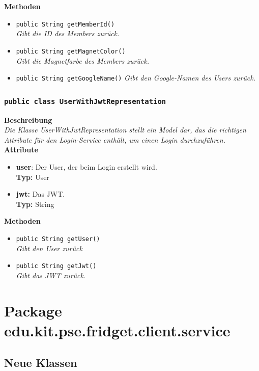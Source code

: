 \documentclass[a4paper]{scrreprt}
\begin{document}
	\textbf{Methoden}
	\begin{itemize}
		\item{\texttt{public String getMemberId()}}\\
		\textit{Gibt die ID des Members zurück.}\\
		\item{\texttt{public String getMagnetColor()}}\\
		\textit{Gibt die Magnetfarbe des Members zurück.}\\
		\item{\texttt{public String getGoogleName()}}
		\textit{Gibt den Google-Namen des Users zurück.}
	\end{itemize}
	\subsubsection{\texttt{public class UserWithJwtRepresentation}}
	\textbf{Beschreibung} \\
	\textit{Die Klasse UserWithJwtRepresentation stellt ein Model dar, das die richtigen Attribute für den Login-Service enthält, um einen Login durchzuführen.} \\
	
	\textbf{Attribute}
	\begin{itemize}
		\item \textbf{user}: Der User, der beim Login erstellt wird. \\
		\textbf{Typ:} User
		
		\item \textbf{jwt:} Das JWT. \\
		\textbf{Typ:} String
	\end{itemize}
	
	\textbf{Methoden}
	\begin{itemize}
		\item{\texttt{public String getUser()}}\\
		\textit{Gibt den User zurück}\\
		\item{\texttt{public String getJwt()}}\\
		\textit{Gibt das JWT zurück.}\\
	\end{itemize}
	
	\section{Package edu.kit.pse.fridget.client.service}
	\subsection{Neue Klassen}
\end{document}
